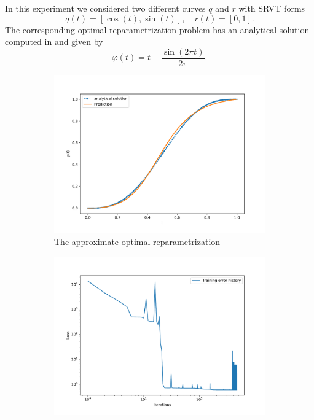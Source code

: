 In this experiment we considered two different curves \(q\) and \(r\) with SRVT forms
\begin{equation*}
    q(t) = [\cos(t), \sin(t)], \quad  r(t) = [0,1]. 
\end{equation*}
The corresponding optimal reparametrization problem has an analytical solution computed in \cite[A.1]{woien2019} and given by 
\begin{equation*}
    \varphi(t) = t - \frac{\sin(2 \pi t)}{2 \pi}.
\end{equation*}

\begin{figure}[b]
    \begin{subfigure}[t]{0.5\textwidth}
        \centering
        \includegraphics[width=\linewidth]{figures/curve_2/exp_3/plot_0_0.pdf}
        \caption{The approximate optimal reparametrization}\label{fig:curve_2_solution}
    \end{subfigure}
    \begin{subfigure}[t]{0.5\textwidth}
        \centering
        \includegraphics[width=\linewidth]{figures/curve_2/exp_3/history_plot_0.pdf}

\end{subfigure}
\end{figure}
